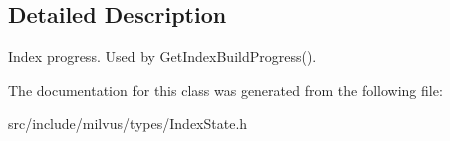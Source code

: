 \subsection{Detailed Description}
Index progress. Used by Get\+Index\+Build\+Progress(). 

The documentation for this class was generated from the following file\+:\begin{DoxyCompactItemize}
\item 
src/include/milvus/types/Index\+State.\+h\end{DoxyCompactItemize}

